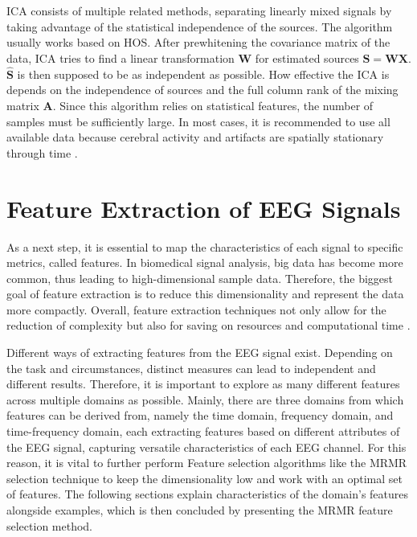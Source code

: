       \ac{ICA} consists of multiple related methods, separating linearly mixed signals by taking advantage of the statistical independence of the sources. The algorithm usually works based on \ac{HOS}. After prewhitening the covariance matrix of the data, \ac{ICA} tries to find a linear transformation $\mathbf{W}$ for estimated sources $\hat{\mathbf{S}} = \mathbf{W} \mathbf{X}$. $\hat{\mathbf{S}}$ is then supposed to be as independent as possible. How effective the \ac{ICA} is depends on the independence of sources and the full column rank of the mixing matrix $\mathbf{A}$. Since this algorithm relies on statistical features, the number of samples must be sufficiently large. In most cases, it is recommended to use all available data because cerebral activity and artifacts are spatially stationary through time \cite{Uriguen_2015}. \par


  \section{Feature Extraction of EEG Signals} \label{sec:feature_extraction_theo}
    As a next step, it is essential to map the characteristics of each signal to specific metrics, called features. In biomedical signal analysis, big data has become more common, thus leading to high-dimensional sample data. Therefore, the biggest goal of feature extraction is to reduce this dimensionality and represent the data more compactly. Overall, feature extraction techniques not only allow for the reduction of complexity but also for saving on resources and computational time \cite{singh2023trends}. \par
    Different ways of extracting features from the \ac{EEG} signal exist. Depending on the task and circumstances, distinct measures can lead to independent and different results. Therefore, it is important to explore as many different features across multiple domains as possible. Mainly, there are three domains from which features can be derived from, namely the time domain, frequency domain, and time-frequency domain, each extracting features based on different attributes of the \ac{EEG} signal, capturing versatile characteristics of each \ac{EEG} channel. For this reason, it is vital to further perform Feature selection algorithms like the \ac{MRMR} selection technique to keep the dimensionality low and work with an optimal set of features. The following sections explain characteristics of the domain’s features alongside examples, which is then concluded by presenting the \ac{MRMR} feature selection method. \par

